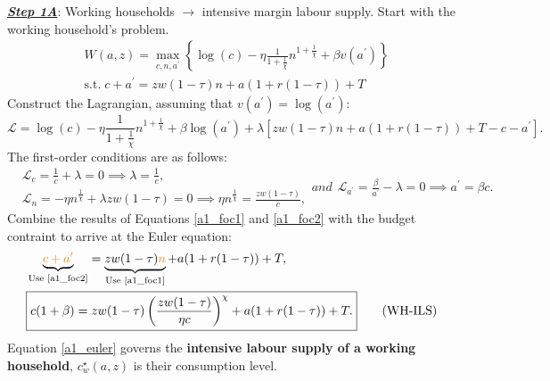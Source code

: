 \colorbox{BurntOrange!25}{\textbf{\textit{\underline{Step 1A}}}: Working households $\to$ intensive margin labour supply.}
Start with the working household's problem.
\begin{equation}
    \begin{aligned}
    &W(a, z)  = \max _{c, n, a^{\prime}} \left\{ \log (c)-\eta \frac{1}{1+\frac{1}{\chi}} n^{1+\frac{1}{\chi}}+\beta v\left(a^{\prime}\right)\right\} \\
    &\text {s.t.} \;  c+a^{\prime}=z w(1-\tau) n+a(1+r(1-\tau))+T
\end{aligned}
\end{equation}
Construct the Lagrangian, assuming that $v\left(a^{\prime}\right)=\log\left(a^{\prime}\right)$:
\begin{equation}
    \mathcal{L}=\log (c)-\eta \frac{1}{1+\frac{1}{\chi}} n^{1+\frac{1}{\chi}}+\beta \log \left(a^{\prime}\right)+\lambda \left[z w(1-\tau) n+a(1+r(1-\tau))+T-c-a^{\prime} \right].
\end{equation}
The first-order conditions are as follows:
\begin{subequations}
    \begin{align}
        & \mathcal{L}_c= \frac{1}{c}+\lambda=0 \implies \lambda = \frac{1}{c}, \\
        & \mathcal{L}_n = -\eta n^{\frac{1}{\chi}}+\lambda zw (1-\tau)=0 \implies \eta n^{\frac{1}{\chi}}=\frac{zw (1-\tau)}{c}, \label{a1_foc1}
    \end{align}
    and 
    \begin{align}
        \mathcal{L}_{a^\prime}=\frac{\beta}{a^\prime}-\lambda =0 \implies a^\prime = \beta c.\label{a1_foc2}
    \end{align}
\end{subequations}
Combine the results of Equations \eqref{a1_foc1} and \eqref{a1_foc2} with the budget contraint to arrive at the Euler equation:
\begin{subequations}
    \begin{align}
        &  \underbrace{ \textcolor{BurntOrange}{c+a^{\prime}}}_{\text{Use \eqref{a1_foc2}}}=\underbrace{z w(1-\tau) \textcolor{BurntOrange}{n}}_{\text{Use \eqref{a1_foc1}}}+a(1+r(1-\tau))+T, \\
        &  \boxed{c(1+\beta)=z w(1-\tau) \left( \frac{z w(1-\tau)}{\eta c}\right)^\chi +a(1+r(1-\tau))+T.} \tag{WH-ILS}\label{a1_euler} 
    \end{align}
\end{subequations}
Equation \eqref{a1_euler} governs the \textcolor{BurntOrange}{\textbf{intensive labour supply of a working household}},  
 $c_w^\star (a,z)$ is their consumption level.\\ 

